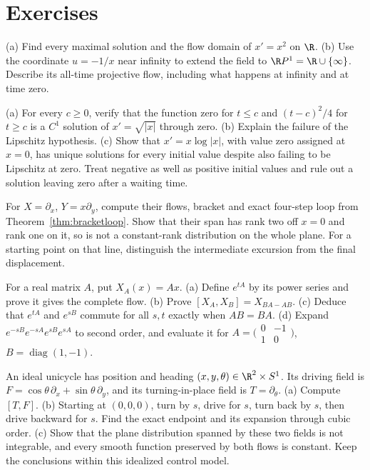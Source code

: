 \section{Exercises}

\begin{exercise}[$\star$]\label{ex:noncomplete}
(a) Find every maximal solution and the flow domain of $x'=x^2$ on $\R$.
(b) Use the coordinate $u=-1/x$ near infinity to extend the field to $\R P^1=\R\cup\{\infty\}$. Describe its all-time projective flow, including what happens at infinity and at time zero.
\end{exercise}

\begin{exercise}[$\star$]\label{ex:sqrtuniqueness}
(a) For every $c\ge0$, verify that the function zero for $t\le c$ and $(t-c)^2/4$ for $t\ge c$ is a $C^1$ solution of $x'=\sqrt{|x|}$ through zero.
(b) Explain the failure of the Lipschitz hypothesis.
(c) Show that $x'=x\log|x|$, with value zero assigned at $x=0$, has unique solutions for every initial value despite also failing to be Lipschitz at zero. Treat negative as well as positive initial values and rule out a solution leaving zero after a waiting time.
\end{exercise}

\begin{exercise}[$\star$]\label{ex:noncommute}
For $X=\partial_x$, $Y=x\partial_y$, compute their flows, bracket and exact four-step loop from Theorem~\ref{thm:bracketloop}. Show that their span has rank two off $x=0$ and rank one on it, so is not a constant-rank distribution on the whole plane. For a starting point on that line, distinguish the intermediate excursion from the final displacement.
\end{exercise}

\begin{exercise}[$\star$]\label{ex:linearfields}
For a real matrix $A$, put $X_A(x)=Ax$.
(a) Define $e^{tA}$ by its power series and prove it gives the complete flow.
(b) Prove $[X_A,X_B]=X_{BA-AB}$.
(c) Deduce that $e^{tA}$ and $e^{sB}$ commute for all $s,t$ exactly when $AB=BA$.
(d) Expand $e^{-sB}e^{-sA}e^{sB}e^{sA}$ to second order, and evaluate it for $A=\bigl(\begin{smallmatrix}0&-1\\1&0\end{smallmatrix}\bigr)$, $B=\operatorname{diag}(1,-1)$.
\end{exercise}

\begin{exercise}[$\star\star$]\label{ex:parking}
An ideal unicycle has position and heading $(x,y,\theta)\in\R^2\times S^1$. Its driving field is $F=\cos\theta\,\partial_x+\sin\theta\,\partial_y$, and its turning-in-place field is $T=\partial_\theta$.
(a) Compute $[T,F]$.
(b) Starting at $(0,0,0)$, turn by $s$, drive for $s$, turn back by $s$, then drive backward for $s$. Find the exact endpoint and its expansion through cubic order.
(c) Show that the plane distribution spanned by these two fields is not integrable, and every smooth function preserved by both flows is constant. Keep the conclusions within this idealized control model.
\end{exercise}

